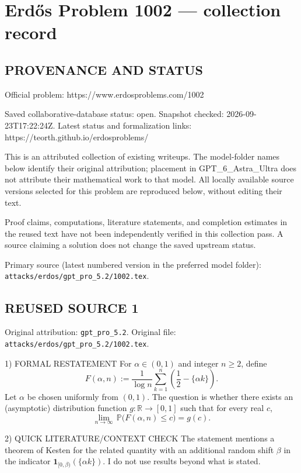 \section*{Erd\H{o}s Problem 1002 --- collection record}

\subsection*{PROVENANCE AND STATUS}
Official problem: https://www.erdosproblems.com/1002

Saved collaborative-database status: open.
Snapshot checked: 2026-09-23T17:22:24Z.
Latest status and formalization links: https://teorth.github.io/erdosproblems/

This is an attributed collection of existing writeups. The model-folder names below identify their original attribution; placement in GPT\_6\_Astra\_Ultra does not attribute their mathematical work to that model. All locally available source versions selected for this problem are reproduced below, without editing their text.

Proof claims, computations, literature statements, and completion estimates in the reused text have not been independently verified in this collection pass. A source claiming a solution does not change the saved upstream status.

Primary source (latest numbered version in the preferred model folder): \texttt{attacks/erdos/gpt\_pro\_5.2/1002.tex}.

\subsection*{REUSED SOURCE 1}
Original attribution: \texttt{gpt\_pro\_5.2}.
Original file: \texttt{attacks/erdos/gpt\_pro\_5.2/1002.tex}.


1) FORMAL RESTATEMENT
For $\alpha\in(0,1)$ and integer $n\ge 2$, define
\[
F(\alpha,n) := \frac{1}{\log n}\sum_{k=1}^n \left(\frac12 - \{\alpha k\}\right).
\]
Let $\alpha$ be chosen uniformly from $(0,1)$.  The question is whether there exists an (asymptotic) distribution function $g:\mathbb{R}\to[0,1]$ such that for every real $c$,
\[
\lim_{n\to\infty}\,\mathbb{P}\bigl(F(\alpha,n)\le c\bigr)=g(c).
\]

2) QUICK LITERATURE/CONTEXT CHECK
The statement mentions a theorem of Kesten for the related quantity with an additional random shift $\beta$ in the indicator $\mathbf 1_{[0,\beta)}(\{\alpha k\})$.  I do not use results beyond what is stated.

